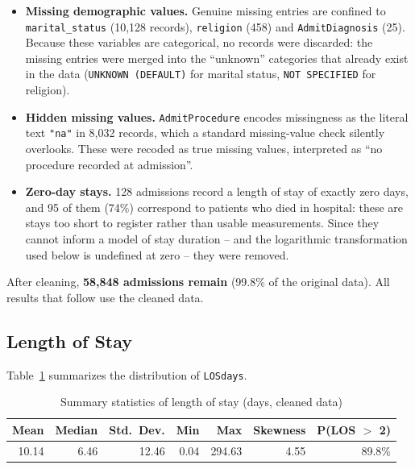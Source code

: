 \begin{itemize}[leftmargin=*, itemsep=4pt]
  \item \textbf{Missing demographic values.} Genuine missing entries are
  confined to \texttt{marital\_status} (10{,}128 records), \texttt{religion}
  (458) and \texttt{AdmitDiagnosis} (25). Because these variables are
  categorical, no records were discarded: the missing entries were merged
  into the ``unknown'' categories that already exist in the data
  (\texttt{UNKNOWN (DEFAULT)} for marital status, \texttt{NOT SPECIFIED}
  for religion).
  \item \textbf{Hidden missing values.} \texttt{AdmitProcedure} encodes
  missingness as the literal text \texttt{"na"} in 8{,}032 records, which a
  standard missing-value check silently overlooks. These were recoded as
  true missing values, interpreted as ``no procedure recorded at
  admission''.
  \item \textbf{Zero-day stays.} 128 admissions record a length of stay of
  exactly zero days, and 95 of them (74\%) correspond to patients who died
  in hospital: these are stays too short to register rather than usable
  measurements. Since they cannot inform a model of stay duration -- and
  the logarithmic transformation used below is undefined at zero -- they
  were removed.
\end{itemize}

After cleaning, \textbf{58{,}848 admissions remain} (99.8\% of the original
data). All results that follow use the cleaned data.

\subsection{Length of Stay}
Table~\ref{tab:los_summary} summarizes the distribution of \texttt{LOSdays}.

\begin{table}[H]
\centering
\caption{Summary statistics of length of stay (days, cleaned data)}
\label{tab:los_summary}
\begin{threeparttable}
\begin{tabular}{r r r r r r r}
\toprule
\textbf{Mean} & \textbf{Median} & \textbf{Std.\ Dev.} & \textbf{Min} & \textbf{Max} & \textbf{Skewness} & \textbf{P(LOS \(>\) 2)} \\
\midrule
10.14 & 6.46 & 12.46 & 0.04 & 294.63 & 4.55 & 89.8\% \\
\bottomrule
\end{tabular}
\end{threeparttable}
\end{table}


